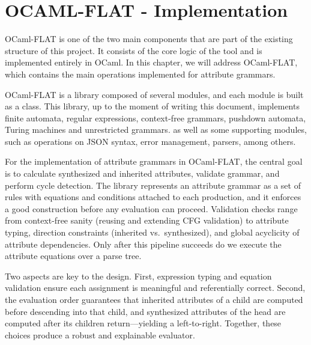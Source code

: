 
%

\chapter{OCAML-FLAT - Implementation}
\label{cha:implementation}

OCaml-FLAT is one of the two main components that are part of the existing structure of this project. It consists of the core logic of the tool and 
is implemented entirely in OCaml. In this chapter, we will address OCaml-FLAT, which contains the main operations implemented for attribute grammars.

OCaml-FLAT is a library composed of several modules, and each module is built as a class. This library, up to the moment of writing this document, implements 
finite automata, regular expressions, context-free grammars, pushdown automata, Turing machines and unrestricted grammars. as well as some supporting modules, 
such as operations on JSON syntax, error management, parsers, among others.

For the implementation of attribute grammars in OCaml-FLAT, the central goal is to calculate synthesized and inherited attributes, validate grammar, and perform cycle detection. The library represents an attribute grammar as a set of rules with equations and conditions attached to each production, and it 
enforces a good construction before any evaluation can proceed. Validation checks range from context-free sanity (reusing and extending CFG validation) to attribute 
typing, direction constraints (inherited vs.\ synthesized), and global acyclicity of attribute dependencies. Only after this pipeline succeeds do we 
execute the attribute equations over a parse tree.

Two aspects are key to the design. First, expression typing and equation validation ensure each assignment is meaningful and referentially correct. 
Second, the evaluation order guarantees that inherited attributes of a child are computed before descending into that child, and synthesized attributes 
of the head are computed after its children return---yielding a left-to-right. Together, these choices produce a robust and explainable evaluator.

